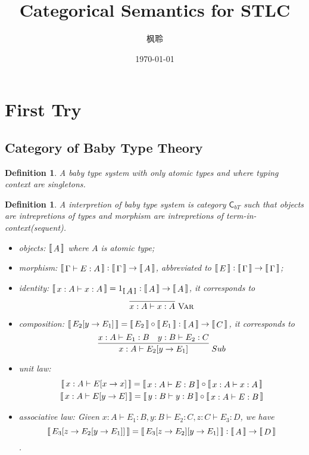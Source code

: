 \documentclass{article}
\title{Categorical Semantics for STLC}
\author{枫聆}
\date{\today}
\newtheorem{definition}[theorem]{Definition}
\newcommand*{\cat}[1]{\textsf{#1}\xspace}
\newcommand{\dbracket}[1]{\ensuremath{\left\llbracket\,\vcenter{\hbox{$#1$}}\,\right\rrbracket}}
\begin{document}
\maketitle
\tableofcontents

\newpage
\section{First Try}
\subsection{Category of Baby Type Theory}

\begin{definition}
\rm A \emph{baby type system} with only atomic types and where typing context are singletons.
\end{definition}

\begin{definition}
\rm A interpretion of baby type system is category $\cat{C}_{bT}$ such that objects are intrepretions of types and morphism are intrepretions of term-in-context(sequent). 
\begin{itemize}
	\item \emph{objects}: $\dbracket{A}$ where $A$ is atomic type;
	\item \emph{morphism}: $\dbracket{\Gamma \vdash E:A}:\dbracket{\Gamma} \to \dbracket{A}$, abbreviated to $\dbracket{E}:\dbracket{\Gamma} \to \dbracket{\Gamma}$;
	\item \emph{identity}: $\dbracket{x:A \vdash x:A} = 1_{\dbracket{A}}:\dbracket{A} \to \dbracket{A}$, it corresponds to \[\infer{x:A \vdash x:A}{}~\textsc{Var}\]
	\item \emph{composition}: $\dbracket{E_2[y\to E_1]} = \dbracket{E_2} \circ \dbracket{E_1}:\dbracket{A} \to \dbracket{C}$, it corresponds to \[\infer{x:A \vdash E_2[y\to E_1]}{x:A \vdash E_1:B & y:B \vdash E_2:C}~{Sub}\]
	\item \emph{unit law}: \[
	\begin{gathered}
	\dbracket{x:A \vdash E[x \to x]} =   \dbracket{x:A \vdash E:B} \circ \dbracket{x:A \vdash x:A}\\
	\dbracket{x:A \vdash E[y \to E]} =   \dbracket{y:B \vdash y:B} \circ \dbracket{x:A \vdash E:B} 
	\end{gathered}\]
	\item \emph{associative law}: Given $x:A \vdash E_1:B, y:B \vdash E_2:C, z:C \vdash E_3:D$, we have\[\dbracket{E_3[z\to E_2[y\to E_1]]} = \dbracket{E_3[z\to E_2][y \to E_1]} : \dbracket{A} \to \dbracket{D}\].
\end{itemize}
\end{definition}
\end{document}
